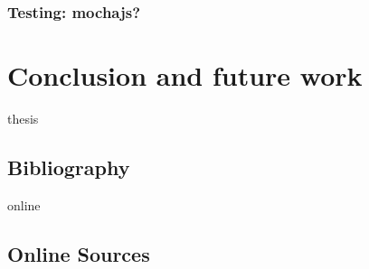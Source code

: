 \documentclass[11pt,a4paper]{report}
\begin{document}
\subsection{Testing: mochajs?}
\chapter{Conclusion and future work} \label{ch:conclusion}
\newpage

\begin{btSect}{thesis} %
\section*{Bibliography}
\btPrintCited
\end{btSect}
\begin{btSect}{online}
\section*{Online Sources}
\btPrintCited
\end{btSect}
\end{document}
